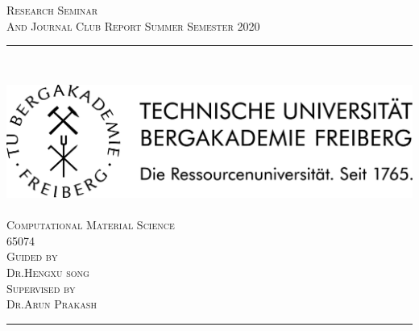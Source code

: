 \begin{titlepage}

    \begin{center}
    \textsc{Research Seminar }\\
    \vspace*{0.2 cm}
    \textsc{And Journal Club Report Summer Semester 2020 }\\
    \vspace*{0.5 cm}
    {\LARGE \textsc{\mytitle}} %
    \vspace{0.025\textheight}
    \rule{0.75\textwidth}{0.45pt}\\
    \vspace*{1 cm}
    
    \includegraphics[scale=0.6]{WBM_schwarz.png}\\
    \vspace*{2.5 cm}
    {\large \textsc{\myauthor}}\\ %
    \vspace{0.025\textheight}
    {\textsc{Computational Material Science}}\\
	\vspace{0.025\textheight}
	{65074}\\
	\vfill
	\textsc{Guided by}\\
	\vspace{0.0025\textheight}
	{\textsc{Dr.Hengxu song}}\\
	\vspace{1 cm}
	\textsc{Supervised by}\\
	\vspace{0.0025\textheight}
	{\textsc{Dr.Arun Prakash}}\\
	\vspace{2 cm}
	{\mydate}
    \vspace{0.25\textheight}     	
	\rule{\textwidth}{1.5pt} 
    \end{center} 
         
\end{titlepage}